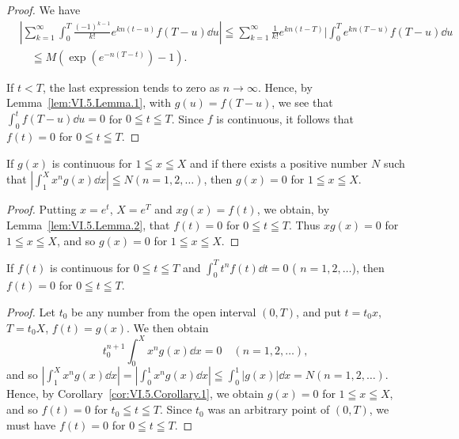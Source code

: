 \begin{proof}
 We have 
\[ \begin{aligned} & \left| \sum\limits_{k=1} ^{\infty} \int_{0} ^{T} \frac {(- 1) ^{k-1}}{k !} e ^{kn(t-u)} f (T - u) \dd u \right| \leqq \sum\limits_{k=1} ^{\infty} \frac {1}{k !} e ^{kn(t-T)} \Bigg | \int_{0} ^{T} e ^{kn(T-u)} f (T - u) \dd u \\ & \quad \leqq M (\exp (e ^{-n(T-t)}) - 1). \end{aligned}
\]

If $t < T$, the last expression tends to zero as $n \to \infty$. Hence, by Lemma~\ref{lem:VI.5.Lemma.1}, with $g(u) = f(T - u)$, we see that $\int_{0}^{t} f(T - u) \dd u = 0$ for $0 \leqq t \leqq T$. Since $f$ is continuous, it follows that $f(t) = 0$ for $0 \leqq t \leqq T$. 
\end{proof}

\begin{corollary}\label{cor:VI.5.Corollary.1} If $g(x)$ is continuous for $1 \leqq x \leqq X$ and if there exists a positive number $N$ such that $\left|\int_{1}^{X} x^n g(x) \dd x\right| \leqq N (n = 1, 2, \ldots)$, then $g(x) = 0$ for $1 \leqq x \leqq X$. 
\end{corollary}

\begin{proof}
 Putting $x = e^t$, $X = e^T$ and $xg(x) = f(t)$, we obtain, by Lemma~\ref{lem:VI.5.Lemma.2}, that $f(t) = 0$ for $0 \leqq t \leqq T$. Thus $xg(x) = 0$ for $1 \leqq x \leqq X$, and so $g(x) = 0$ for $1 \leqq x \leqq X$. 
\end{proof}

\begin{corollary}\label{cor:VI.5.Corollary.2} If $f(t)$ is continuous for $0 \leqq t \leqq T$ and $\int_{0}^{T} t^n f(t) \dd t = 0$ ( $n = 1, 2, \ldots$), then $f(t) = 0$ for $0 \leqq t \leqq T$. 
\end{corollary}

\begin{proof}
 Let $t_0$ be any number from the open interval $(0, T)$, and put $t = t_0x$, $T = t_0X$, $f(t) = g(x)$. We then obtain 
\[
t _{0} ^{n+1} \int_{0} ^{X} x ^{n} g (x) \dd x = 0 \quad (n = 1, 2, \dots),
\]
and so $\left|\int_{1}^{X}x^{n}g(x)\dd x\right| = \left|\int_{0}^{1}x^{n}g(x)\dd x\right|\leqq \int_{0}^{1}|g(x)|\dd x = N (n = 1,2,\ldots)$. Hence, by Corollary~\ref{cor:VI.5.Corollary.1}, we obtain $g(x) = 0$ for $1\leqq x\leqq X$, and so $f(t) = 0$ for $t_0\leqq t\leqq T$. Since $t_0$ was an arbitrary point of $(0,T)$, we must have $f(t) = 0$ for $0\leqq t\leqq T$. 
\end{proof}

